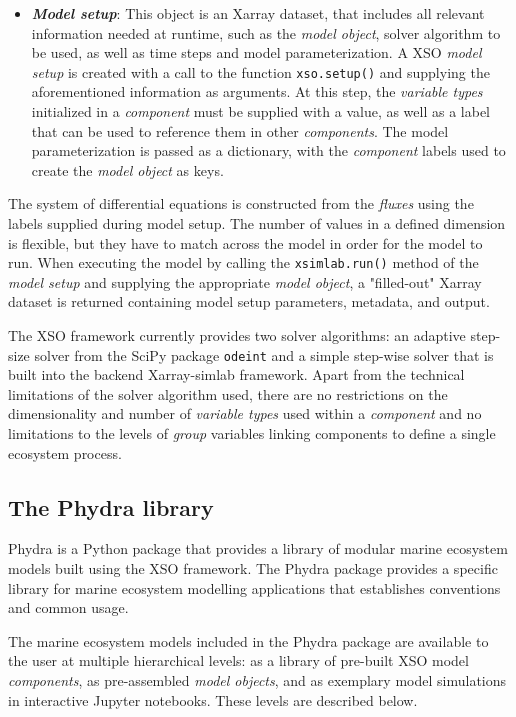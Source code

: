 \documentclass[journal abbreviation, manuscript]{copernicus}
\begin{document}
\begin{itemize}
   \item \textbf{\textit{Model setup}}: This object is an Xarray dataset, that includes all relevant information needed at runtime, such as the \textit{model object}, solver algorithm to be used, as well as time steps and model parameterization. A XSO \textit{model setup} is created with a call to the function \texttt{xso.setup()} and supplying the aforementioned information as arguments. At this step, the \textit{variable types} initialized in a \textit{component} must be supplied with a value, as well as a label that can be used to reference them in other \textit{components}. The model parameterization is passed as a dictionary, with the \textit{component} labels used to create the \textit{model object} as keys.
\end{itemize}

The system of differential equations is constructed from the \textit{fluxes} using the labels supplied during model setup. The number of values in a defined dimension is flexible, but they have to match across the model in order for the model to run. 
When executing the model by calling the \texttt{xsimlab.run()} method of the \textit{model setup} and supplying the appropriate \textit{model object}, a "filled-out" Xarray dataset is returned containing model setup parameters, metadata, and output.

The XSO framework currently provides two solver algorithms: an adaptive step-size solver from the SciPy package \texttt{odeint} and a simple step-wise solver that is built into the backend Xarray-simlab framework. Apart from the technical limitations of the solver algorithm used, there are no restrictions on the dimensionality and number of \textit{variable types} used within a \textit{component} and no limitations to the levels of \textit{group} variables linking components to define a single ecosystem process. 




\subsection{The Phydra library} \label{Section:PhydraLibrary}
Phydra is a Python package that provides a library of modular marine ecosystem models built using the XSO framework. The Phydra package provides a specific library for marine ecosystem modelling applications that establishes conventions and common usage.

The marine ecosystem models included in the Phydra package are available to the user at multiple hierarchical levels: as a library of pre-built XSO model \textit{components}, as pre-assembled \textit{model objects}, and as exemplary model simulations in interactive Jupyter notebooks. These levels are described below.
\end{document}
